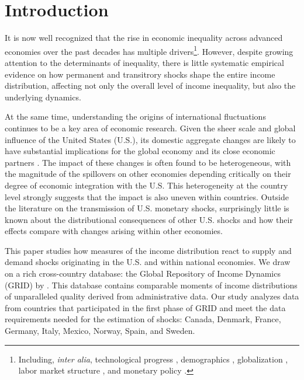 \documentclass[12pt, a4paper]{article}
\begin{document}
\section{Introduction}
It is now well recognized that the rise in economic inequality across advanced economies over the past decades has multiple drivers\footnote{Including, \emph{inter alia}, technological progress \parencite{Bound1995, Acemoglu2002}, demographics \parencite{Karahan2013}, globalization \parencite{feenstra2003global}, labor market structure \parencite{jaumotte2015inequality}, and monetary policy \parencite{coibion2017innocent, furceri2018effects, Amberg2022, andersen2023monetary}.}. However, despite growing attention to the determinants of inequality, there is little systematic empirical evidence on how permanent and transitrory shocks shape the entire income distribution, affecting not only the overall level of income inequality, but also the underlying dynamics.

At the same time, understanding the origins of international fluctuations continues to be a key area of economic research. Given the sheer scale and global influence of the United States (U.S.), its domestic aggregate changes are likely to have substantial implications for the global economy and its close economic partners \parencite{Kose2003, canova2005transmission, Kose2012, kose2017global, kalemli2013global, Fink2015, rey2016, ramey2016macroeconomic, miranda2022global, carrillo2020inquiry, levchenko2020tfp, lakdawala2021international, dees2021global, di2022international, lastauskas2023global}. The impact of these changes is often found to be heterogeneous, with the magnitude of the spillovers on other economies depending critically on their degree of economic integration with the U.S. This heterogeneity at the country level strongly suggests that the impact is also uneven within countries. Outside the literature on the transmission of U.S. monetary shocks, surprisingly little is known about the distributional consequences of other U.S. shocks and how their effects compare with changes arising within other economies.

This paper studies how measures of the income distribution react to supply and demand shocks originating in the U.S. and within national economies. We draw on a rich cross-country database: the Global Repository of Income Dynamics (GRID) by \textcite{guvenen2022global}. This database contains comparable moments of income distributions of unparalleled quality derived from administrative data. Our study analyzes data from countries that participated in the first phase of GRID and meet the data requirements needed for the estimation of shocks: Canada, Denmark, France, Germany, Italy, Mexico, Norway, Spain, and Sweden.
\end{document}
